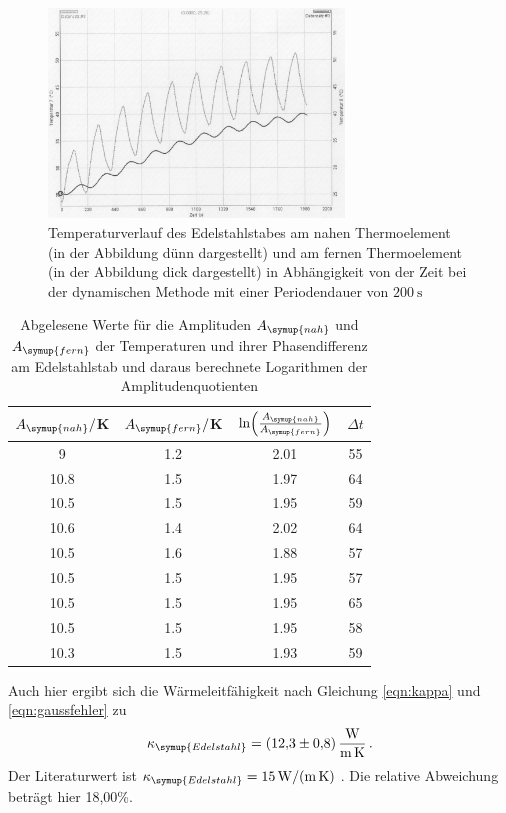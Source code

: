 \begin{figure}
  \centering
  \includegraphics[width=0.7\textwidth]{data/t7undt8_welle.JPEG}
  \caption{Temperaturverlauf des Edelstahlstabes am nahen Thermoelement (in der Abbildung dünn dargestellt)
  und am fernen Thermoelement (in der Abbildung dick dargestellt) in Abhängigkeit von der Zeit bei der
  dynamischen Methode mit einer Periodendauer von $\SI{200}{\second}$}
  \label{fig:edelstahl_welle}
\end{figure}

\begin{table}
  \centering
  \caption{Abgelesene Werte für die Amplituden $A_{\symup{nah}}$ und $A_{\symup{fern}}$ der Temperaturen und
  ihrer Phasendifferenz am Edelstahlstab und daraus berechnete Logarithmen der Amplitudenquotienten}
  \label{tab:edelstahl_welle}
  \begin{tabular}{c c c c}
    \toprule
     $A_{\symup{nah}}/$K  & $A_{\symup{fern}}/$K & $\ln\Bigl(\frac{A_{\symup{nah}}}{A_{\symup{fern}}}\Bigr)$ & $\Delta t$ \\
    \midrule
    9	    & 1.2 &	2.01  & 55 \\
    10.8	& 1.5 & 1.97	& 64  \\
    10.5  &	1.5	& 1.95  & 59  \\
    10.6	& 1.4	& 2.02  & 64 \\
    10.5	& 1.6	& 1.88  & 57 \\
    10.5	& 1.5	& 1.95  & 57 \\
    10.5	& 1.5	& 1.95  & 65 \\
    10.5	& 1.5	& 1.95  & 58 \\
    10.3  &	1.5	& 1.93  & 59  \\
    \bottomrule
  \end{tabular}
\end{table}

Auch hier ergibt sich die Wärmeleitfähigkeit nach Gleichung \eqref{eqn:kappa}
und \eqref{eqn:gaussfehler} zu
\begin{align}
  \kappa_{\symup{Edelstahl}} = \SI{12.3(08)}{\watt\per\meter\per\kelvin}\,.\nonumber
\end{align}
Der Literaturwert ist $\kappa_{\symup{Edelstahl}} = \SI{15}{\watt\per\meter\per\kelvin}$
\cite{Wärmeleitfähigkeit3}.
Die relative Abweichung beträgt hier 18,00\%.
